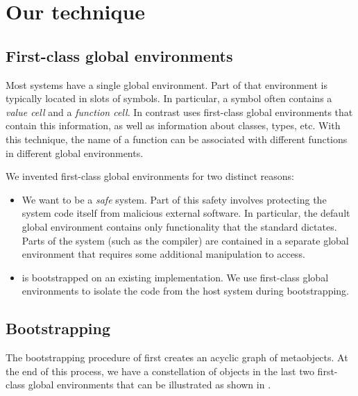 \section{Our technique}
\label{sec-our-technique}

\subsection{First-class global environments}
\label{sec-first-class-global-environments}

Most \commonlisp{} systems have a single global environment.  Part of
that environment is typically located in slots of symbols.  In
particular, a symbol often contains a \emph{value cell} and a
\emph{function cell}.  In contrast \sicl{} uses first-class global
environments \cite{Strandh:2015:ELS:Environments} that contain this
information, as well as information about classes, types, etc.
With this technique, the name of a function can be associated with
different functions in different global environments.

We invented first-class global environments for two distinct reasons:

\begin{itemize}
\item We want \sicl{} to be a \emph{safe} system.  Part of this safety
  involves protecting the system code itself from malicious external
  software.  In particular, the default global environment contains
  only functionality that the \commonlisp{} standard dictates.  Parts
  of the system (such as the compiler) are contained in a separate
  global environment that requires some additional manipulation to
  access.
\item \sicl{} is bootstrapped
  \cite{Durand-Strandh:2019:ELS:Bootstrapping} on an existing
  \commonlisp{} implementation.  We use first-class global
  environments to isolate the \sicl{} code from the host system during
  bootstrapping.
\end{itemize}

\subsection{Bootstrapping}

The bootstrapping procedure of \sicl{} first creates an acyclic graph
of metaobjects.  At the end of this process, we have a constellation
of objects in the last two first-class global environments that can be
illustrated as shown in .

